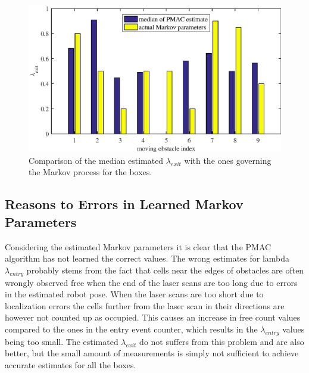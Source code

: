 \begin{figure}
    \centering
    \includegraphics[scale=1]{chapters/evaluation/figures/compare_learned_markov_exit}
    \caption{Comparison of the median estimated $\lambda_{exit}$ with the ones governing the Markov process for the boxes.}
    \label{fig:compare_learned_markov_exit}
\end{figure}

\subsection{Reasons to Errors in Learned Markov Parameters}
Considering the estimated Markov parameters it is clear that the PMAC algorithm has not learned the correct values.
The wrong estimates for lambda $\lambda_{entry}$ probably stems from the fact that cells near the edges of obstacles are often wrongly observed free when the end of the laser scans are too long due to errors in the estimated robot pose. 
When the laser scans are too short due to localization errors the cells further from the laser scan in their directions are however not counted up as occupied.
This causes an increase in free count values compared to the ones in the entry event counter, which results in the $\lambda_{entry}$ values being too small.
The estimated $\lambda_{exit}$ do not suffers from this problem and are also better, but the small amount of measurements is simply not sufficient to achieve accurate estimates for all the boxes. 